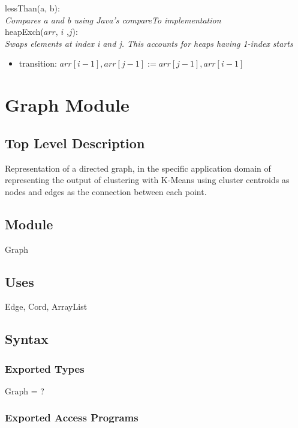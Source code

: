 \documentclass[12pt]{article}
\begin{document}
\noindent
lessThan(a, b):\\
\textit{Compares a and b using Java's compareTo implementation}\\

\noindent
heapExch($arr$, $i$ ,$j$):\\
\textit{Swaps elements at index i and j. This accounts for heaps having 1-index starts}
\begin{itemize}
\item transition: $arr[i-1], arr[j-1] := arr[j-1], arr[i-1]$
\end{itemize}

\newpage


\section*{Graph Module}

\subsection* {Top Level Description}

Representation of a directed graph, in the specific application domain of representing
the output of clustering with K-Means using cluster centroids as nodes and edges as
the connection between each point.

\subsection*{Module}

Graph

\subsection* {Uses}

Edge, Cord, ArrayList

\subsection* {Syntax}

\subsubsection* {Exported Types}

Graph = ?

\subsubsection* {Exported Access Programs}
\end{document}
